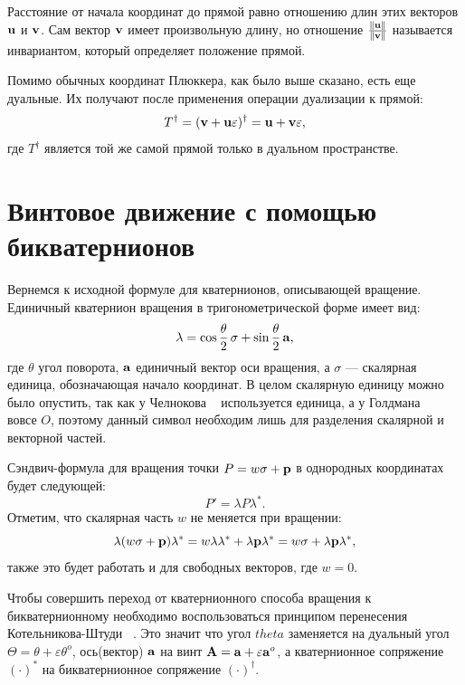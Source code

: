 Расстояние от начала координат до прямой равно отношению длин этих векторов $\vb{u}$ и $\vb{v}$. Сам вектор $\vb{v}$ имеет произвольную длину, но отношение $\frac{\|\vb{u}\|}{\|\vb{v}\|}$ называется инвариантом, который определяет положение прямой.

Помимо обычных координат Плюккера, как было выше сказано, есть еще дуальные. Их получают после применения операции дуализации к прямой:
\begin{equation*}
    T^\dagger = (\vb{v} + \vb{u}\varepsilon)^\dagger = \vb{u} + \vb{v}\varepsilon,
\end{equation*}
где $T^\dagger$ является той же самой прямой только в дуальном пространстве.

\section{Винтовое движение с помощью бикватернионов}
\label{sec:ScrewMotion}

Вернемся к исходной формуле для кватернионов, описывающей вращение. Единичный кватернион вращения в тригонометрической форме имеет вид:
\begin{equation*}
    \lambda = \cos\frac{\theta}{2} \,\sigma + \sin\frac{\theta}{2} \,\vb{a},
\end{equation*}
где $\theta$ угол поворота, $\vb{a}$ единичный вектор оси вращения, а $\sigma$ --- скалярная единица, обозначающая начало координат. В целом скалярную единицу можно было опустить, так как у Челнокова ~\cite{Chelnokov:2006} используется единица, а у Голдмана ~\cite{Goldman:2023} вовсе $O$, поэтому данный символ необходим лишь для разделения скалярной и векторной частей.

Сэндвич-формула для вращения точки $P = w\sigma + \vb{p}$ в однородных координатах будет следующей:
\begin{equation*}
    P' = \lambda P \lambda^*.
\end{equation*}
Отметим, что скалярная часть $w$ не меняется при вращении:
\begin{equation*}
    \lambda(w\sigma + \vb{p})\lambda^* = w\lambda\lambda^* + \lambda\vb{p}\lambda^* = w\sigma + \lambda\vb{p}\lambda^*,
\end{equation*}
также это будет работать и для свободных векторов, где $w = 0$.

Чтобы совершить переход от кватернионного способа вращения к бикватернионному необходимо воспользоваться принципом перенесения Котельникова-Штуди ~\cite{Kotelnikov:2006}. Это значит что угол $theta$ заменяется на дуальный угол  $\Theta = \theta + \varepsilon \theta^o$, ось(вектор) $\vb{a}$ на винт $\vb{A} = \vb{a} + \varepsilon \vb{a}^o$, а кватернионное сопряжение $(\cdot)^*$ на бикватернионное сопряжение $(\cdot)^\dagger$.

